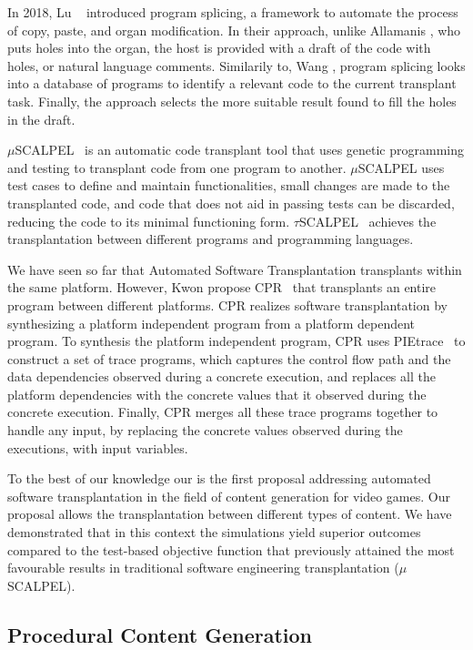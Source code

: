 In 2018, Lu \etal~\cite{lu2018program} introduced program splicing, a framework to automate the process of copy, paste, and organ modification. In their approach, unlike Allamanis \etal, who puts holes into the organ, the host is provided with a draft of the code with holes, or natural language comments. Similarily to, Wang \etal, program splicing looks into a database of programs to identify a relevant code to the current transplant task. Finally, the approach selects the more suitable result found to fill the holes in the draft.

$\mu$SCALPEL~\cite{barr2015automated} is an automatic code transplant tool that uses genetic programming and testing to transplant code from one program to another. $\mu$SCALPEL uses test cases to define and maintain functionalities, small changes are made to the transplanted code, and code that does not aid in passing tests can be discarded, reducing the code to its minimal functioning form. $\tau$SCALPEL~\cite{marginean2021automated} achieves the transplantation between different programs and programming languages. 

We have seen so far that Automated Software Transplantation transplants within the same platform. However, Kwon \etal propose CPR~\cite{kwon2017cpr} that transplants an entire program between different platforms. CPR realizes software transplantation by synthesizing a platform independent program from a platform dependent program. To synthesis the platform independent program, CPR uses PIEtrace~\cite{kwon2013pietrace} to construct a set of trace programs, which captures the control flow path and the data dependencies observed during a concrete execution, and replaces all the platform dependencies with the concrete values that it observed during the concrete execution. Finally, CPR merges all these trace programs together to handle any input, by replacing the concrete values observed during the executions, with input variables. 

To the best of our knowledge our is the first proposal addressing automated software transplantation in the field of content generation for video games. Our proposal allows the transplantation between different types of content. We have demonstrated that in this context the simulations yield superior outcomes compared to the test-based objective function that previously attained the most favourable results in traditional software engineering transplantation ($\mu$SCALPEL).

\subsection{Procedural Content Generation}

